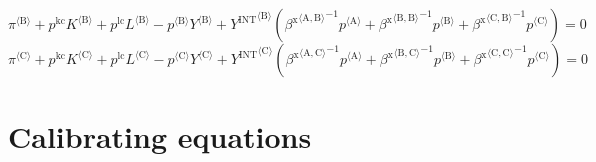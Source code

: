 \begin{equation}
{\pi}^{\langle \mathrm{B}\rangle} + {p^{\mathrm{kc}}} {{K}^{\langle \mathrm{B}\rangle}} + {p^{\mathrm{lc}}} {{L}^{\langle \mathrm{B}\rangle}} - {{p}^{\langle \mathrm{B}\rangle}} {{Y}^{\langle \mathrm{B}\rangle}} + {{Y^{\mathrm{INT}}}^{\langle \mathrm{B}\rangle}} \left({{\beta^{\mathrm{x}}}^{\langle \mathrm{\mathrm{A}},\mathrm{\mathrm{B}}\rangle}}^{-1} {{p}^{\langle \mathrm{A}\rangle}} + {{\beta^{\mathrm{x}}}^{\langle \mathrm{\mathrm{B}},\mathrm{\mathrm{B}}\rangle}}^{-1} {{p}^{\langle \mathrm{B}\rangle}} + {{\beta^{\mathrm{x}}}^{\langle \mathrm{\mathrm{C}},\mathrm{\mathrm{B}}\rangle}}^{-1} {{p}^{\langle \mathrm{C}\rangle}}\right) = 0
\end{equation}
\begin{equation}
{\pi}^{\langle \mathrm{C}\rangle} + {p^{\mathrm{kc}}} {{K}^{\langle \mathrm{C}\rangle}} + {p^{\mathrm{lc}}} {{L}^{\langle \mathrm{C}\rangle}} - {{p}^{\langle \mathrm{C}\rangle}} {{Y}^{\langle \mathrm{C}\rangle}} + {{Y^{\mathrm{INT}}}^{\langle \mathrm{C}\rangle}} \left({{\beta^{\mathrm{x}}}^{\langle \mathrm{\mathrm{A}},\mathrm{\mathrm{C}}\rangle}}^{-1} {{p}^{\langle \mathrm{A}\rangle}} + {{\beta^{\mathrm{x}}}^{\langle \mathrm{\mathrm{B}},\mathrm{\mathrm{C}}\rangle}}^{-1} {{p}^{\langle \mathrm{B}\rangle}} + {{\beta^{\mathrm{x}}}^{\langle \mathrm{\mathrm{C}},\mathrm{\mathrm{C}}\rangle}}^{-1} {{p}^{\langle \mathrm{C}\rangle}}\right) = 0
\end{equation}



\section{Calibrating equations}


